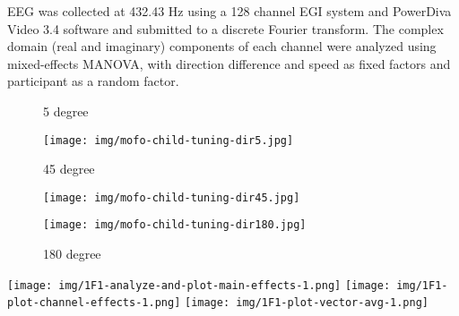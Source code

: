 \documentclass[landscape,final,paperwidth=72in,paperheight=41.5in,fontscale=0.285]{baposter}
\begin{document}
\begin{poster}
{      EEG was collected at 432.43 Hz using a 128 channel EGI system and PowerDiva Video 3.4 software and submitted to a discrete Fourier transform. 
      The complex domain (real and imaginary) components of each channel were analyzed using mixed-effects MANOVA, with direction difference and speed as fixed factors and participant as a random factor.  
      }
    {
\begin{figure}[H]
  \centering
  \caption{5 degree}\label{mofo-child-tuning-dir5.jpg}
  \texttt{[image: img/mofo-child-tuning-dir5.jpg]}
  \vspace{0.5em}

  \caption{45 degree}\label{mofo-child-tuning-dir45.jpg}
  \texttt{[image: img/mofo-child-tuning-dir45.jpg]}
  \vspace{0.5em}

  \caption{180 degree}\label{mofo-child-tuning-dir180.jpg}
  \texttt{[image: img/mofo-child-tuning-dir180.jpg]}
\end{figure}      

    }
{

\begin{center}

  \texttt{[image: img/1F1-analyze-and-plot-main-effects-1.png]}
  \hfill
  \texttt{[image: img/1F1-plot-channel-effects-1.png]}
  \hfill
  \texttt{[image: img/1F1-plot-vector-avg-1.png]}
  
\end{center}

}
\end{poster}
\end{document}
